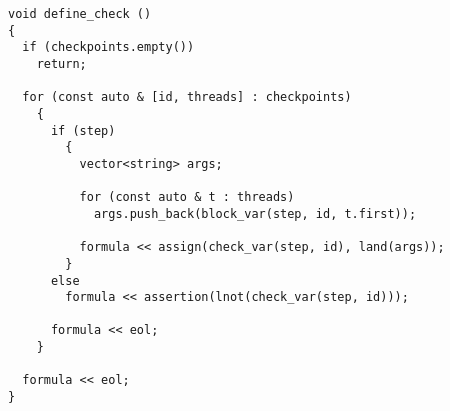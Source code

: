 \begin{algorithm}[H]
\end{algorithm}

\begin{algorithm}[H]
\end{algorithm}

\begin{algorithm}[H]
\end{algorithm}

\begin{algorithm}[H]
\end{algorithm}

\begin{lstlisting}[style=c++]
void define_check ()
{
  if (checkpoints.empty())
    return;

  for (const auto & [id, threads] : checkpoints)
    {
      if (step)
        {
          vector<string> args;

          for (const auto & t : threads)
            args.push_back(block_var(step, id, t.first));

          formula << assign(check_var(step, id), land(args));
        }
      else
        formula << assertion(lnot(check_var(step, id)));

      formula << eol;
    }

  formula << eol;
}
\end{lstlisting}

